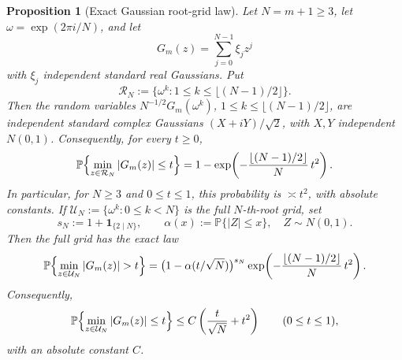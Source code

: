 \documentclass[11pt]{amsart}
\numberwithin{equation}{section}
\newtheorem{proposition}[theorem]{Proposition}
\theoremstyle{definition}
\theoremstyle{remark}
\newcommand{\Prob}{\mathbb P}
\newcommand{\abs}[1]{\left\lvert #1\right\rvert}
\begin{document}
\begin{proposition}[Exact Gaussian root-grid law]\label{prop:gaussian-root-grid}
Let \(N=m+1\ge3\), let \(\omega=\exp(2\pi i/N)\), and let
\[
  G_m(z)=\sum_{j=0}^{N-1}\xi_jz^j
\]
with \(\xi_j\) independent standard real Gaussians.  Put
\[
  \mathcal R_N:=\{\omega^k:1\le k\le \lfloor(N-1)/2\rfloor\}.
\]
Then the random variables \(N^{-1/2}G_m(\omega^k)\), \(1\le k\le
\lfloor(N-1)/2\rfloor\), are independent standard complex Gaussians
\((X+iY)/\sqrt2\), with \(X,Y\) independent \(N(0,1)\).  Consequently, for
every \(t\ge0\),
\begin{equation}\label{eq:gaussian-root-grid}
  \Prob\Bigl\{\min_{z\in\mathcal R_N}\abs{G_m(z)}\le t\Bigr\}
  =1-\exp\!\left(-\frac{\lfloor(N-1)/2\rfloor}{N}\,t^2\right).
\end{equation}
In particular, for \(N\ge3\) and \(0\le t\le1\), this probability is
\(\asymp t^2\), with absolute constants.  If
\(\mathcal U_N:=\{\omega^k:0\le k<N\}\) is the full \(N\)-th-root grid, set
\[
  s_N:=1+\mathbf1_{\{2\mid N\}},
  \qquad
  \alpha(x):=\Prob\{|Z|\le x\},\quad Z\sim N(0,1).
\]
Then the full grid has the exact law
\begin{equation}\label{eq:gaussian-full-root-grid-exact}
  \Prob\Bigl\{\min_{z\in\mathcal U_N}\abs{G_m(z)}>t\Bigr\}
  =
  \bigl(1-\alpha(t/\sqrt N)\bigr)^{s_N}
  \exp\!\left(-\frac{\lfloor(N-1)/2\rfloor}{N}\,t^2\right).
\end{equation}
Consequently,
\begin{equation}\label{eq:gaussian-full-root-grid}
  \Prob\Bigl\{\min_{z\in\mathcal U_N}\abs{G_m(z)}\le t\Bigr\}
  \le C\left(\frac{t}{\sqrt N}+t^2\right)
  \qquad(0\le t\le1),
\end{equation}
with an absolute constant \(C\).
\end{proposition}
\end{document}
